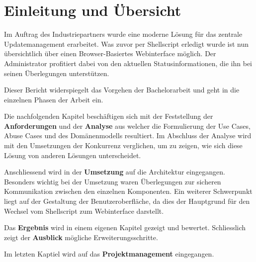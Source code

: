 \begin{comment}
Einführung in die Problem- und Aufgabenstellung. Übersicht über die übrigen Teile der Abgabe.

Diese Einleitung soll für den Ingenieur irgendeiner Fachrichtung verständlich sein. Sie stellt die Aufgabe in einen grösseren Zusammenhang und liefert eine genaue Beschreibung der Problemstellung. Allfällige Vorarbeiten oder ähnlich gelagerte Arbeiten werden diskutiert.
\end{comment}

\chapter{Einleitung und Übersicht}
\xxx[]

Im Auftrag des Industriepartners wurde eine moderne Lösung für das zentrale Updatemanagement erarbeitet. Was zuvor per Shellscript erledigt wurde ist nun übersichtlich über einen Browser-Basiertes Webinterface möglich. Der Administrator profitiert dabei von den aktuellen Statusinformationen, die ihn bei seinen Überlegungen unterstützen.

Dieser Bericht widerspiegelt das Vorgehen der Bachelorarbeit und geht in die einzelnen Phasen der Arbeit ein.

Die nachfolgenden Kapitel beschäftigen sich mit der Feststellung der \textbf{Anforderungen} und der \textbf{Analyse} aus welcher die Formulierung der Use Cases, Abuse Cases und des Domänenmodells resultiert. Im Abschluss der Analyse wird mit den Umsetzungen der Konkurrenz verglichen, um zu zeigen, wie sich diese Lösung von anderen Lösungen unterscheidet.

Anschliessend wird in der \textbf{Umsetzung} auf die Architektur eingegangen. Besonders wichtig bei der Umsetzung waren Überlegungen zur sicheren Kommunikation zwischen den einzelnen Komponenten. Ein weiterer Schwerpunkt liegt auf der Gestaltung der Benutzeroberfläche, da dies der Hauptgrund für den Wechsel vom Shellscript zum Webinterface darstellt.

Das \textbf{Ergebnis} wird in einem eigenen Kapitel gezeigt und bewertet. Schliesslich zeigt der \textbf{Ausblick} mögliche Erweiterungsschritte.

Im letzten Kaptiel wird auf das \textbf{Projektmanagement} eingegangen.
